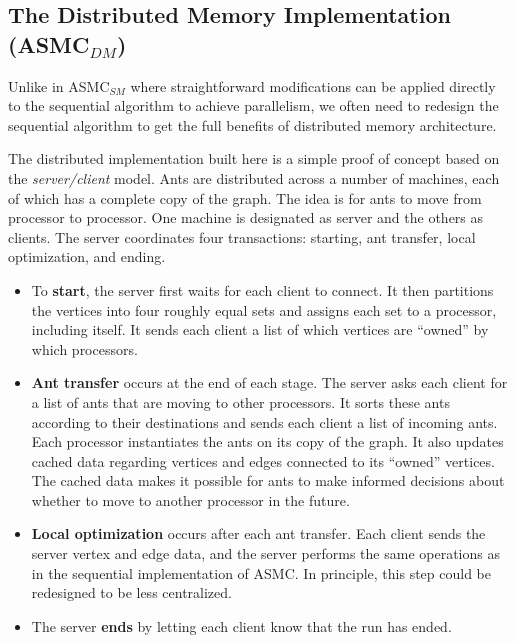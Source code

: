 \documentclass[11pt]{article}
\begin{document}
\subsection{The Distributed Memory Implementation (ASMC$_{DM}$)}\label{ASMC_dist} 

Unlike in ASMC$_{SM}$ where straightforward modifications can be applied directly to the sequential algorithm to achieve parallelism, we often need to redesign the sequential algorithm to get the full benefits of distributed memory architecture. 

The distributed implementation built here is a simple proof of concept based on the \textit{server/client} model.  Ants are distributed across a number of machines, each of which has a complete copy of the graph.  The idea is for ants to move from processor to processor.  One machine is designated as server and the others as clients.  The server coordinates four transactions: starting, ant transfer, local optimization, and ending.


\begin{itemize}

\item To {\bf start}, the server first waits for each client to connect.  It then partitions the vertices into four roughly equal sets and assigns each set to a processor, including itself.  It sends each client a list of which vertices are ``owned'' by which processors.

\item {\bf Ant transfer} occurs at the end of each stage.  The server asks each client for a list of ants that are moving to other processors.  It sorts these ants according to their destinations and sends each client a list of incoming ants.  Each processor instantiates the ants on its copy of the graph. It also updates cached data regarding vertices and edges connected to its ``owned'' vertices.  The cached data makes it possible for ants to make informed decisions about whether to move to another processor in the future.

\item {\bf Local optimization} occurs after each ant transfer.  Each client sends the server vertex and edge data, and the server performs the same operations as in the sequential implementation of ASMC.  In principle, this step could be redesigned to be less centralized.

\item The server {\bf ends} by letting each client know that the run has ended.  %

\end{itemize}
\end{document}
